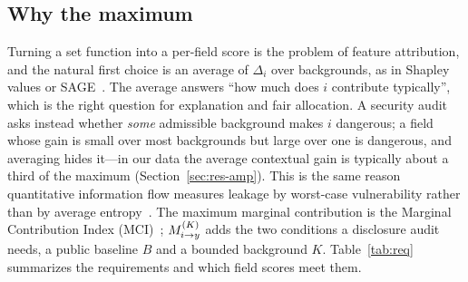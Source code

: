 \subsection{Why the maximum}
Turning a set function into a per-field score is the problem of feature attribution, and the
natural first choice is an average of $\Delta_i$ over backgrounds, as in Shapley values or
SAGE~\cite{covert2020sage}. The average answers ``how much does $i$ contribute typically'', which is
the right question for explanation and fair allocation. A security audit asks instead whether
\emph{some} admissible background makes $i$ dangerous; a field whose gain is small over most
backgrounds but large over one is dangerous, and averaging hides it---in our data the average
contextual gain is typically about a third of the maximum (Section~\ref{sec:res-amp}). This is the
same reason quantitative information flow measures leakage by worst-case
vulnerability rather than by average entropy~\cite{smith2009qif,alvim2012gleakage}. The maximum
marginal contribution is the Marginal Contribution Index (MCI)~\cite{catav2021mci}; $M^{(K)}_{i \to y}$ adds the
two conditions a disclosure audit needs, a public baseline $B$ and a bounded background $K$.
Table~\ref{tab:req} summarizes the requirements and which field scores meet them.

\begin{table}[!t]
\centering\small
\caption{Requirements for a field-level inference-risk quantity. \checkmark: satisfied;
$\circ$: partially; --: not satisfied.}\label{tab:req}
\end{table}

